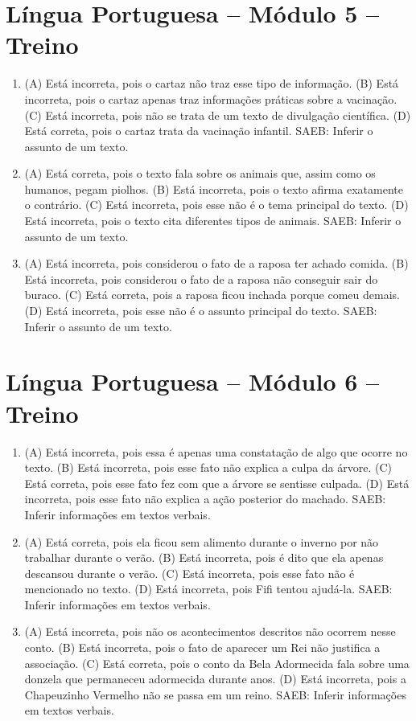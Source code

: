 \section*{Língua Portuguesa – Módulo 5 – Treino}

\begin{enumerate}
\item
(A) Está incorreta, pois o cartaz não traz esse tipo de informação.
(B) Está incorreta, pois o cartaz apenas traz informações práticas sobre a vacinação.
(C) Está incorreta, pois não se trata de um texto de divulgação científica.
(D) Está correta, pois o cartaz trata da vacinação infantil.
SAEB: Inferir o assunto de um texto.

\item
(A) Está correta, pois o texto fala sobre os animais que, assim como os humanos, pegam piolhos.
(B) Está incorreta, pois o texto afirma exatamente o contrário.
(C) Está incorreta, pois esse não é o tema principal do texto.
(D) Está incorreta, pois o texto cita diferentes tipos de animais.
SAEB: Inferir o assunto de um texto.

\item
(A) Está incorreta, pois considerou o fato de a raposa ter achado comida.
(B) Está incorreta, pois considerou o fato de a raposa não conseguir
sair do buraco.
(C) Está correta, pois a raposa ficou inchada porque comeu demais.
(D) Está incorreta, pois esse não é o assunto principal do texto.
SAEB: Inferir o assunto de um texto.
\end{enumerate}

\section*{Língua Portuguesa – Módulo 6 – Treino}

\begin{enumerate}
\item
(A) Está incorreta, pois essa é apenas uma constatação de algo que ocorre no texto.
(B) Está incorreta, pois esse fato não explica a culpa da árvore.
(C) Está correta, pois esse fato fez com que a árvore se sentisse culpada.
(D) Está incorreta, pois esse fato não explica a ação posterior do machado.
SAEB: Inferir informações em textos verbais.

\item
(A) Está correta, pois ela ficou sem alimento durante o inverno por não trabalhar durante o verão.
(B) Está incorreta, pois é dito que ela apenas descansou durante o verão.
(C) Está incorreta, pois esse fato não é mencionado no texto.
(D) Está incorreta, pois Fifi tentou ajudá-la.
SAEB: Inferir informações em textos verbais.

\item
(A) Está incorreta, pois não os acontecimentos descritos não ocorrem nesse conto.
(B) Está incorreta, pois o fato de aparecer um Rei não justifica a associação.
(C) Está correta, pois o conto da Bela Adormecida fala sobre uma donzela que permaneceu adormecida durante anos.
(D) Está incorreta, pois a Chapeuzinho Vermelho não se passa em um reino.
SAEB: Inferir informações em textos verbais.
\end{enumerate}

